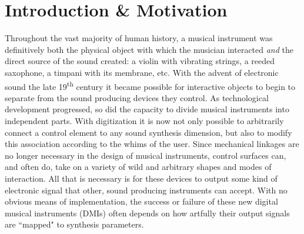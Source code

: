 
\chapter{Introduction \& Motivation}
Throughout the vast majority of human history, a musical instrument was definitively both the physical object with which the musician interacted \emph{and} the direct source of the sound created: a violin with vibrating strings, a reeded saxophone, a timpani with its membrane, etc.  With the advent of electronic sound the late 19\textsuperscript{th} century 
it became possible for interactive objects to begin to separate from the sound producing devices they control. %
As technological development progressed, so did the capacity to divide musical instruments into independent parts. With digitization it is now not only possible to arbitrarily connect a control element to any sound synthesis dimension, but also to modify this association according to the whims of the user. Since mechanical linkages are no longer necessary in the design of musical instruments, control surfaces can, and often do, take on a variety of wild and arbitrary shapes and modes of interaction. %
All that is necessary is for these devices to output some kind of electronic signal that other, sound producing instruments can accept. With no obvious means of implementation, the success or failure of these new digital musical instruments (DMIs) often depends on how artfully their output signals are ``mapped" to synthesis parameters.

